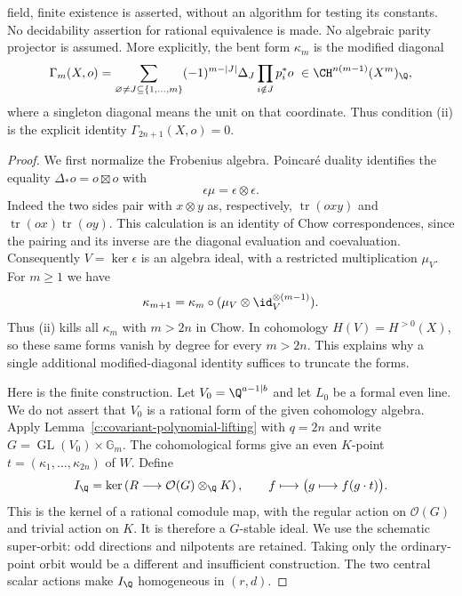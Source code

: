 \begin{theorem}
field, finite existence is asserted, without an algorithm for
testing its constants.  No decidability assertion for rational
equivalence is made.  No algebraic parity projector is assumed.
More explicitly, the bent form $\kappa_m$ is the modified diagonal
\begin{equation}
 \Gamma_m(X,o)=
 \sum_{\varnothing\ne J\subseteq\{1,\ldots,m\}}
       (-1)^{m-|J|}\Delta_J\prod_{i\notin J}p_i^*o
       \ \in\CH^{n(m-1)}(X^m)_\Q,
 \label{eq:c-explicit-higher-modified-diagonal}
\end{equation}
where a singleton diagonal means the unit on that coordinate.
Thus condition (ii) is the explicit identity
$\Gamma_{2n+1}(X,o)=0$.
\end{theorem}

\begin{proof}
We first normalize the Frobenius algebra.  Poincar\'e duality
identifies the equality $\Delta_*o=o\boxtimes o$ with
\[
 \epsilon\mu=\epsilon\otimes\epsilon.
\]
Indeed the two sides pair with $x\otimes y$ as, respectively,
$\operatorname{tr}(oxy)$ and
$\operatorname{tr}(ox)\operatorname{tr}(oy)$.  This calculation
is an identity of Chow correspondences, since the pairing and
its inverse are the diagonal evaluation and coevaluation.
Consequently $V=\ker\epsilon$ is an algebra ideal, with a
restricted multiplication $\mu_V$.  For $m\geq1$ we have
\begin{equation}
 \kappa_{m+1}
   =\kappa_m\circ(\mu_V\otimes\id_V^{\otimes(m-1)}).
 \label{eq:c-high-form-recursion}
\end{equation}
Thus (ii) kills all $\kappa_m$ with $m>2n$ in Chow.  In
cohomology $H(V)=H^{>0}(X)$, so these same forms vanish by
degree for every $m>2n$.  This explains why a single additional
modified-diagonal identity suffices to truncate the forms.

Here is the finite construction.  Let $V_0=\Q^{a-1|b}$ and let
$L_0$ be a formal even line.  We do not assert that $V_0$ is a
rational form of the given cohomology algebra.  Apply
Lemma~\ref{c:covariant-polynomial-lifting} with $q=2n$ and write
$G=\operatorname{GL}(V_0)\times\mathbb G_m$.
The cohomological forms give an even $K$-point
$t=(\kappa_1,\ldots,\kappa_{2n})$ of $W$.  Define
\begin{equation}
 I_\Q=\ker\left(R\longrightarrow\mathcal O(G)\otimes_\Q K\right),
 \qquad f\longmapsto\bigl(g\longmapsto f(g\cdot t)\bigr).
 \label{eq:c-pure-form-orbit}
\end{equation}
This is the kernel of a rational comodule map, with the regular
action on $\mathcal O(G)$ and trivial action on $K$.  It is
therefore a $G$-stable ideal.  We use the schematic super-orbit:
odd directions and nilpotents are retained.  Taking only the
ordinary-point orbit would be a different and insufficient
construction.  The two central scalar actions make $I_\Q$
homogeneous in $(r,d)$.


\end{proof}
